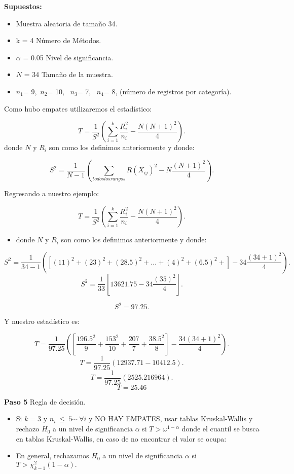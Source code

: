 \documentclass[
  a4paper,
  oneside,
  openany]{book}
\providecommand{\tightlist}{%
  \setlength{\itemsep}{0pt}\setlength{\parskip}{0pt}}
\begin{document}
\textbf{Supuestos:}

\begin{itemize}
\tightlist
\item
  Muestra aleatoria de tamaño 34.
\item
  k = 4 Número de Métodos.
\item
  \(\alpha\) = 0.05 Nivel de significancia.
\item
  \(N\) = 34 Tamaño de la muestra.
\item
  \(n_{1}\)= 9,~\(n_{2}\)= 10, ~\(n_{3}\)= 7, ~\(n_{4}\)= 8, (número de registros por categoría).
\end{itemize}

Como hubo empates utilizaremos el estadístico:

\[T= \frac{1}{S^2}\left(\sum_{i=1}^{k}\frac{R^2_{i}}{n_{i}}-\frac{N(N+1)^2}{4}\right).\]
donde \(N\) y \(R_{i}\) son como los definimos anteriormente y donde:

\[ S^2 = \frac{1}{N-1}\left(\sum_{todos los rangos}R(X_{ij})^2-N\frac{(N+1)^2}{4}\right).\]

Regresando a nuestro ejemplo:

\[T= \frac{1}{S^2}\left(\sum_{i=1}^{k}\frac{R^2_{i}}{n_{i}}-\frac{N(N+1)^2}{4}\right).\]

\begin{itemize}
\tightlist
\item
  donde \(N\) y \(R_{i}\) son como los definimos anteriormente y donde:
\end{itemize}

\[ S^2 = \frac{1}{34-1}\left(\left[(11)^2+(23)^2+(28.5)^2+\ldots+(4)^2+(6.5)^2+\right]-34\frac{(34+1)^2}{4}\right).\]
\[S^2 = \frac{1}{33}\left[13621.75-34\frac{(35)^2}{4}\right].\]

\[S^2 = 97.25.\]

Y nuestro estadístico es:

\[T= \frac{1}{97.25}\left(\left[\frac{196.5^2}{9}+\frac{153^2}{10}+\frac{207}{7}+\frac{38.5^2}{8}\right]-\frac{34(34+1)^2}{4}\right).\]
\[T= \frac{1}{97.25}\left(12937.71-10412.5\right).\]
\[T= \frac{1}{97.25}\left(2525.216964\right).\]
\[T= 25.46\]

\textbf{Paso 5} Regla de decisión.

\begin{itemize}
\item
  Si \(k =3\) y \(n_{i} \ \leq \ 5 \cdots \ \forall i\) y NO HAY EMPATES, usar tablas Kruskal-Wallis y rechazo \(H_0\) a un nivel de significancia \(\alpha\) si \(T > \omega^{1-\alpha}\) donde el cuantil se busca en tablas Kruskal-Wallis, en caso de no encontrar el valor se ocupa:
\item
  En general, rechazamos \(H_0\) a un nivel de significancia \(\alpha\) si \(T > \chi_{k-1}^2(1- \alpha).\)
\end{itemize}
\end{document}
